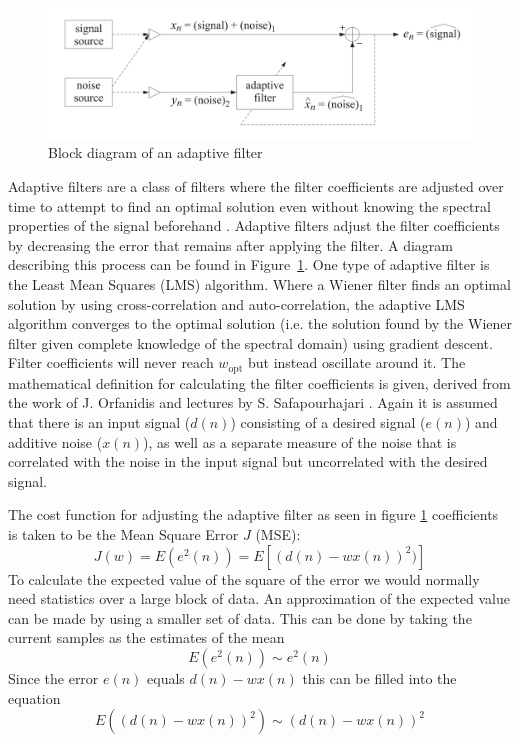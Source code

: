 \begin{figure}[h!t]
	\begin{center}
		\includegraphics[width=1.0\columnwidth]{images/adaptive_filter_block_diagram.png}
	\end{center}
	\caption{Block diagram of an adaptive filter \cite{introduction_optimal_signal_processing}}
	\label{fig:adaptive_filter_diagram}
\end{figure}

Adaptive filters are a class of filters where the filter coefficients are adjusted over time to attempt to find an optimal solution even without knowing the spectral properties of the signal beforehand \cite{adaptive_filter_and_applications}. Adaptive filters adjust the filter coefficients by decreasing the error that remains after applying the filter. A diagram describing this process can be found in Figure~\ref{fig:adaptive_filter_diagram}. 
One type of adaptive filter is the Least Mean Squares (LMS) algorithm. Where a Wiener filter finds an optimal solution by using cross-correlation and auto-correlation, the adaptive LMS algorithm converges to the optimal solution (i.e. the solution found by the Wiener filter given complete knowledge of the spectral domain) using gradient descent. Filter coefficients will never reach $w_\text{opt}$ but instead oscillate around it. The mathematical definition for calculating the filter coefficients is given, derived from the work of J. Orfanidis \cite[Ch. 7.3]{introduction_optimal_signal_processing} and lectures by S. Safapourhajari \cite{lecture_adaptive_filters_2}. Again it is assumed that there is an input signal ($d(n)$) consisting of a desired signal ($e(n)$) and additive noise ($x(n)$), as well as a separate measure of the noise that is correlated with the noise in the input signal but uncorrelated with the desired signal.

The cost function for adjusting the adaptive filter as seen in figure \ref{fig:adaptive_filter_diagram} coefficients is taken to be the Mean Square Error $J$ (MSE):
\begin{equation}
    J(w) = E(e^2(n)) = E[(d(n) - wx(n))^2)]
\end{equation}
To calculate the expected value of the square of the error we would normally need statistics over a large block of data. An approximation of the expected value can be made by using a smaller set of data. This can be done by taking the current samples as the estimates of the mean
\begin{equation}
    E(e^2(n)) \sim e^2(n)
\end{equation}
Since the error $e(n)$ equals $d(n) - wx(n)$ this can be filled into the equation
\begin{equation}
    E \left( \left(d(n) - wx(n)\right)^2 \right) \sim \left(d(n) - wx(n)\right)^2
\end{equation}

